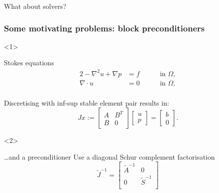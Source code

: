 \documentclass[presentation,aspectratio=43, 10pt]{beamer}
\begin{document}
\begin{frame}[standout]
  What about solvers?
\end{frame}

\begin{frame}[t]
  \frametitle{Some motivating problems: block preconditioners}

  \begin{onlyenv}<1>
    \begin{block}{Stokes equations}
      \begin{alignat*}{2}
        -\nabla^2 u + \nabla p &= f \quad && \text{ in } \Omega, \\
        \nabla \cdot u &= 0 \quad && \text{ in } \Omega, \\
      \end{alignat*}

      Discretising with inf-sup stable element pair results in:
      \begin{equation*}
        Jx := \begin{bmatrix}
          A & B^T \\
          B & 0
        \end{bmatrix}
        \begin{bmatrix}
          u \\ p
        \end{bmatrix}
        =
        \begin{bmatrix}
          b \\ 0
        \end{bmatrix}.
      \end{equation*}
    \end{block}
  \end{onlyenv}
  \begin{onlyenv}<2>
    \begin{block}{\dots and a preconditioner}
      Use a diagonal Schur complement factorisation
      \parencite{Silvester:1994}
      \begin{equation*}
        \tilde{J}^{-1} =
        \begin{bmatrix}
          \tilde{A}^{-1}  & 0 \\
          0 & \tilde{S}^{-1} \\
        \end{bmatrix}
      \end{equation*}


\end{block}
\end{onlyenv}
\end{frame}
\end{document}

